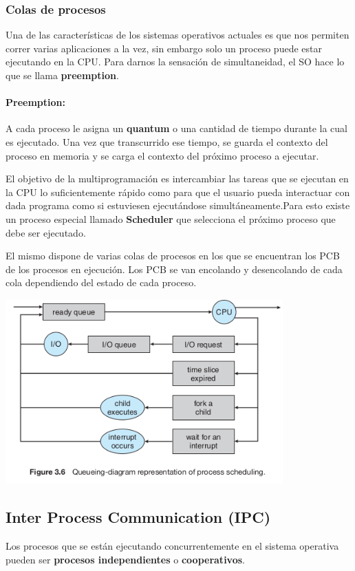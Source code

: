 	\subsubsection{Colas de procesos}
Una de las características de los sistemas operativos actuales es que nos permiten correr varias aplicaciones a la vez, sin embargo solo un proceso puede estar ejecutando en la CPU. Para darnos la sensación de simultaneidad, el SO hace lo que se llama \textbf{preemption}.

\paragraph{Preemption:} A cada proceso le asigna un \textbf{quantum} o una cantidad de tiempo durante la cual es ejecutado. Una vez que transcurrido ese tiempo, se guarda el contexto del proceso en memoria y se carga el contexto del próximo proceso a ejecutar.

El objetivo de la multiprogramación es intercambiar las tareas que se ejecutan en la CPU lo suficientemente rápido como para que el usuario pueda interactuar con dada programa como si estuviesen ejecutándose simultáneamente.Para esto existe un proceso especial llamado \textbf{Scheduler} que selecciona el próximo proceso que debe ser ejecutado.

El mismo dispone de varias colas de procesos en los que se encuentran los PCB de los procesos en ejecución. Los PCB se van encolando y desencolando de cada cola dependiendo del estado de cada proceso.

\vspace*{0.5cm}
\begin{center}
	\includegraphics[width=0.8\textwidth]{imagenes/process_queues.png}
\end{center}

\subsection{Inter Process Communication (IPC)}
Los procesos que se están ejecutando concurrentemente en el sistema operativa pueden ser \textbf{procesos independientes} o \textbf{cooperativos}.


